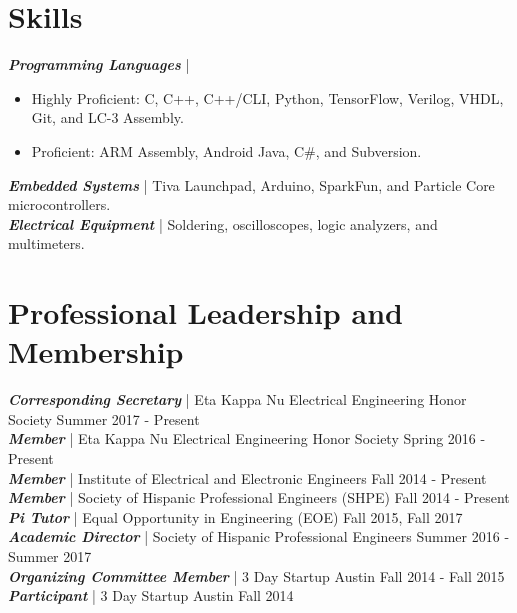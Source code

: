 \documentclass[letter]{res}
\begin{document}
\begin{resume}
\vspace{-2mm}
 
\section{Skills}
{\sl \textbf{Programming Languages}} | 
\begin{itemize}
 \item Highly Proficient: C, C++, C++/CLI, Python, TensorFlow, Verilog, VHDL, Git, and LC-3 Assembly.
 \item Proficient: ARM Assembly, Android Java, C\#, and Subversion.
\end{itemize}
 \vspace{-4mm}
{\sl \textbf{Embedded Systems}} | Tiva Launchpad, Arduino, SparkFun, and Particle Core microcontrollers.\\
{\sl \textbf{Electrical Equipment}} | Soldering, oscilloscopes, logic analyzers, and multimeters.\\

\vspace{-6mm}

\section{Professional Leadership and Membership}
{\sl \textbf{Corresponding Secretary}} | Eta Kappa Nu Electrical Engineering Honor Society \hfill Summer 2017 - Present\\
{\sl \textbf{Member}} | Eta Kappa Nu Electrical Engineering Honor Society \hfill Spring 2016 - Present\\
{\sl \textbf{Member}} | Institute of Electrical and Electronic Engineers \hfill Fall 2014 - Present\\
{\sl \textbf{Member}} | Society of Hispanic Professional Engineers (SHPE) \hfill Fall 2014 - Present\\
{\sl \textbf{Pi Tutor}} | Equal Opportunity in Engineering (EOE) \hfill Fall 2015, Fall 2017\\
{\sl \textbf{Academic Director}} | Society of Hispanic Professional Engineers \hfill Summer 2016 - Summer 2017\\
{\sl \textbf{Organizing Committee Member}} | 3 Day Startup Austin \hfill Fall 2014 - Fall 2015\\
{\sl \textbf{Participant}} | 3 Day Startup Austin \hfill Fall 2014\\

\vspace{-6mm}


\end{resume}
\end{document}
